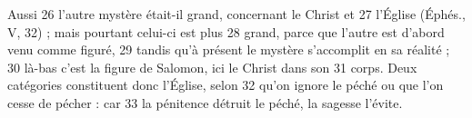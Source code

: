 Aussi	 
26	 	l'autre mystère était-il grand, concernant le Christ et	 
27	 	l'Église (Éphés., V, 32) ; mais pourtant celui-ci est plus	 
28	 	grand, parce que l'autre est d'abord venu comme figuré,	 
29	 	tandis qu'à présent le mystère s'accomplit en sa réalité ;	 
30	 	là-bas c'est la figure de Salomon, ici le Christ dans son	 
31	 	corps. Deux catégories constituent donc l'Église, selon	 
32	 	qu'on ignore le péché ou que l'on cesse de pécher : car	 
33	 	la pénitence détruit le péché, la sagesse l'évite.